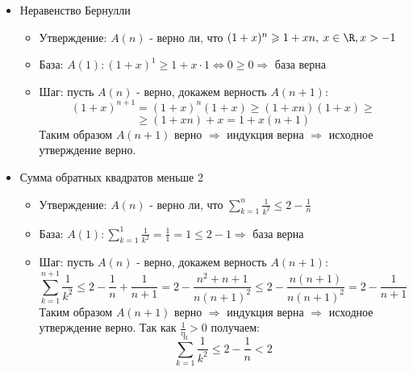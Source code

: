 \begin{itemize}
		\item Неравенство Бернулли
		\begin{itemize}
			\item Утверждение: $A(n)$ - верно ли, что $(1 + x)^n \geqslant 1 + xn, \: x \in \R, x > -1$
			\item База: $A(1) \colon (1 + x)^1 \geqslant 1 + x\cdot1 \Leftrightarrow 0 \geqslant 0 \Rightarrow$ база верна
			\item Шаг: пусть $A(n)$ - верно, докажем верность $A(n + 1)$:
			$$(1 + x)^{n + 1} = (1 + x)^n(1 + x) \geqslant (1 + xn)(1 + x)\geqslant$$$$ \geqslant (1 + xn) + x = 1 + x(n + 1)$$
			Таким образом $A(n + 1)$ верно $\Rightarrow$ индукция верна $\Rightarrow$ исходное утверждение верно.
		\end{itemize}
		\item Сумма обратных квадратов меньше 2
		\begin{itemize}
			\item Утверждение: $A(n)$ - верно ли, что $\displaystyle\sum_{k=1}^{n} \frac{1}{k^2} \leqslant 2 - \frac{1}{n}$
			\item База: $A(1)\colon \displaystyle\sum_{k=1}^{1}\frac{1}{k^2} = \frac{1}{1} = 1 \leqslant 2 - 1 \Rightarrow$ база верна
			\item Шаг: пусть $A(n)$ - верно, докажем верность $A(n + 1)$:
			$$\displaystyle\sum_{k=1}^{n+1} \frac{1}{k^2}  \leqslant 2 - \frac{1}{n} + \frac{1}{n+1} = 2 - \frac{n^2 + n + 1}{n(n + 1)^2} \leqslant 2 - \frac{n(n + 1)}{n(n+1)^2} = 2 - \frac{1}{n+1}$$
			Таким образом $A(n + 1)$ верно $\Rightarrow$ индукция верна $\Rightarrow$ исходное утверждение верно. Так как $\frac{1}{n} > 0$ получаем:
			$$\displaystyle\sum_{k=1}^{n} \frac{1}{k^2} \leqslant 2 - \frac{1}{n} < 2$$
		\end{itemize} 
	\end{itemize}
